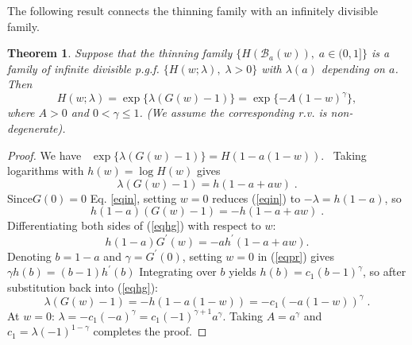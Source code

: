 \documentclass[a4paper,12pt]{amsart}
\newtheorem{Theorem}{Theorem}[section]
\theoremstyle{definition}
\theoremstyle{remark}
\begin{document}
The following result connects the thinning family with an infinitely divisible family.
\begin{Theorem}\label{eq: infdthin}
Suppose that the thinning family $\{H(\mathcal{B}_a(w)),\; a\in (0,1]\}$ is a family of infinite divisible p.g.f. $\{H(w;\lambda),\; \lambda>0 \}$ with $\lambda(a)$ depending on $a$. Then 
\[H(w;\lambda) = \exp\{\lambda(G(w)-1)\}=
\exp\{-A (1-w)^{\gamma}\} ,\] 
where $A>0$ and $0<\gamma \leq 1$. (We assume the corresponding r.v. is non-degenerate).
\end{Theorem}
\begin{proof}
We have ~$\exp\{\lambda(G(w)-1)\} = H(1\!-\!a(1-\!w))$.~
Taking  logarithms with $h(w)=\log H(w)$ gives
\begin{equation}\label{eqin}
\lambda (G(w)-1) = h(1-a+a w)\;.    
\end{equation}
Since$G(0)=0$ Eq. \ref{eqin}, setting $w=0$ reduces (\ref{eqin}) to  $-\lambda=h(1-a)$, so
\begin{equation}\label{eqhg}
h(1-a) (G(w) -1) = -h(1-a+a w)\;.    
\end{equation}
Differentiating both sides of (\ref{eqhg}) with respect to $w$:
\begin{equation}\label{eqpr}
h(1-a)G^{\prime}(w) = -a h^{\prime}(1-a+a w).
\end{equation}
Denoting $b=1-a$ and $\gamma = G^{\prime}(0)$, setting $w=0$ in (\ref{eqpr}) gives $\gamma h(b)=(b-1)h^{\prime}(b)$
 Integrating over $b$ yields $h(b)= c_1(b-1)^{\gamma}$, so after substitution back into  (\ref{eqhg}):
\[
 \lambda(G(w)-1)= -h(1-a(1- w))=-c_1(-a(1-w))^{\gamma}\;.
 \]
At $w=0$: $\lambda=-c_1(-a)^{\gamma}= c_1(-1)^{\gamma+1}a^{\gamma}$. Taking $A=a^{\gamma}$ and $c_1=\lambda(-1)^{1-\gamma}$ completes the proof. 
\end{proof}

\end{document}
